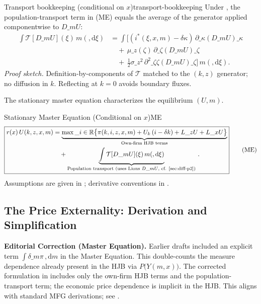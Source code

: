 ﻿\documentclass[11pt,letterpaper,oneside]{article}
\numberwithin{equation}{section}
\newcommand{\R}{\mathbb{R}}
\newcommand{\1}{\mathbf{1}}
\newcommand{\diff}{,\mathrm{d}}
\newcommand{\Lz}{L\_z}
\newcommand{\Lx}{L\_x}
\newcommand{\dmU}{D\_m U}
\newcommand{\Dm}{D\_m}
\begin{document}
\begin{lemma}{Transport bookkeeping (conditional on $x$)}{transport-bookkeeping}
Under , the population-transport term in (ME) equals the average of the generator applied componentwise to $\Dm U$:
\[
\begin{aligned}
\int \mathcal{T}[\Dm U](\xi)\, m(\diff \xi)
&= \int \Big[(i^*(\xi,x,m)-\delta\kappa)\,\partial\_{\kappa}(\Dm U)\!\_\kappa \\
&\quad +\, \mu\_z(\zeta)\,\partial\_{\zeta}(\Dm U)\!\_\zeta \\
&\quad +\, \tfrac12\sigma\_z^2\,\partial^2\_{\zeta\zeta}(\Dm U)\!\_\zeta\Big] \, m(\diff \xi).
\end{aligned}
\]
\emph{Proof sketch.} Definition-by-components of $\mathcal{T}$ matched to the $(k,z)$ generator; no diffusion in $k$. Reflecting at $k=0$ avoids boundary fluxes.
\end{lemma}

The stationary master equation characterizes the equilibrium $(U,m)$.

\begin{theorem}{Stationary Master Equation (Conditional on $x$)}{ME}
\begin{equation}
\boxed{\begin{aligned}
r(x)\,U(k,z,x,m) &= \underbrace{\max\_{i\in\R}\big\{\pi(k,i,z,x,m) + U_k\,(i-\delta k) + \Lz U + \Lx U\big\}}_{\text{Own-firm HJB terms}} \\
&\quad + \underbrace{\int \mathcal{T}[\dmU](\xi)\, m(\diff \xi)}_{\text{Population transport (uses Lions $\Dm U$, cf. \Cref{sec:diff-p2})}}\,.
\end{aligned}}
\tag{ME}\label{eq:ME}
\end{equation}
Assumptions are given in ; derivative conventions in .
\end{theorem}

\subsection{The Price Externality: Derivation and Simplification}\label{sec:me-externality}

\begin{tcolorbox}[mathstyle]
\textbf{Editorial Correction (Master Equation).} Earlier drafts included an explicit term $\int \delta\_m \pi\,\diff m$ in the Master Equation. This double-counts the measure dependence already present in the HJB via $P\big(Y(m,x)\big)$. The corrected formulation in  includes only the own-firm HJB terms and the population-transport term; the economic price dependence is implicit in the HJB. This aligns with standard MFG derivations; see \cite{carmona_delarue_2018_mfg,cardaliaguet_delarue_lasry_lions_2019}.
\end{tcolorbox}
\end{document}
